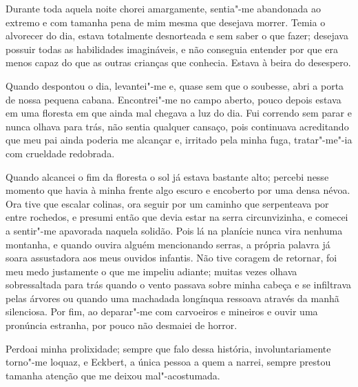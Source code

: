 Durante toda aquela noite chorei amargamente, sentia"-me abandonada ao
extremo e com tamanha pena de mim mesma que desejava morrer. Temia o
alvorecer do dia, estava totalmente desnorteada e sem saber o que
fazer; desejava possuir todas as habilidades imagináveis, e não
conseguia entender por que era menos capaz do que as outras crianças
que conhecia. Estava à beira do desespero.

Quando despontou o dia, levantei"-me e, quase sem que o soubesse, abri a
porta de nossa pequena cabana. Encontrei"-me no campo aberto, pouco
depois estava em uma floresta em que ainda mal chegava a luz do dia.
Fui correndo sem parar e nunca olhava para trás, não sentia qualquer
cansaço, pois continuava acreditando que meu pai ainda poderia me
alcançar e, irritado pela minha fuga, tratar"-me"-ia com crueldade redobrada.

Quando alcancei o fim da floresta o sol já estava bastante alto; percebi
nesse momento que havia à minha frente algo escuro e encoberto por uma
densa névoa. Ora tive que escalar colinas, ora seguir por um caminho
que serpenteava por entre rochedos, e presumi então que devia estar
na serra circunvizinha, e comecei a sentir"-me apavorada naquela
solidão. Pois lá na planície nunca vira nenhuma montanha, e quando
ouvira alguém mencionando serras, a própria palavra já soara
assustadora aos meus ouvidos infantis. Não tive coragem de retornar,
foi meu medo justamente o que me impeliu adiante; muitas vezes olhava
sobressaltada para trás quando o vento passava sobre minha cabeça e se
infiltrava pelas árvores ou quando uma machadada longínqua ressoava
através da manhã silenciosa. Por fim, ao deparar"-me com carvoeiros e
mineiros e ouvir uma pronúncia estranha, por pouco não desmaiei de horror.

Perdoai minha prolixidade; sempre que falo dessa história,
involuntariamente torno"-me loquaz, e Eckbert, a única pessoa a quem a
narrei, sempre prestou tamanha atenção que me deixou mal"-acostumada.

